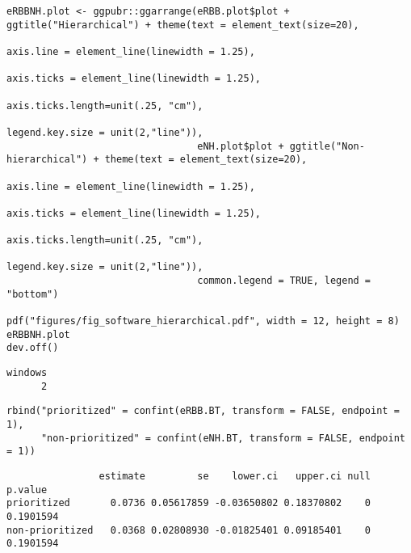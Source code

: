 \documentclass[12pt]{article}
\begin{document}
\lstset{language=r,label= ,caption= ,captionpos=b,numbers=none}
\begin{lstlisting}
eRBBNH.plot <- ggpubr::ggarrange(eRBB.plot$plot + ggtitle("Hierarchical") + theme(text = element_text(size=20), 
                                                                                  axis.line = element_line(linewidth = 1.25),
                                                                                  axis.ticks = element_line(linewidth = 1.25),
                                                                                  axis.ticks.length=unit(.25, "cm"),
                                                                                  legend.key.size = unit(2,"line")),
                                 eNH.plot$plot + ggtitle("Non-hierarchical") + theme(text = element_text(size=20), 
                                                                                     axis.line = element_line(linewidth = 1.25),
                                                                                     axis.ticks = element_line(linewidth = 1.25),
                                                                                     axis.ticks.length=unit(.25, "cm"),
                                                                                     legend.key.size = unit(2,"line")),
                                 common.legend = TRUE, legend = "bottom")

pdf("figures/fig_software_hierarchical.pdf", width = 12, height = 8)
eRBBNH.plot
dev.off()
\end{lstlisting}

\begin{verbatim}
windows 
      2
\end{verbatim}


\lstset{language=r,label= ,caption= ,captionpos=b,numbers=none}
\begin{lstlisting}
rbind("prioritized" = confint(eRBB.BT, transform = FALSE, endpoint = 1),
      "non-prioritized" = confint(eNH.BT, transform = FALSE, endpoint = 1))

\end{lstlisting}

\begin{verbatim}
                estimate         se    lower.ci   upper.ci null   p.value
prioritized       0.0736 0.05617859 -0.03650802 0.18370802    0 0.1901594
non-prioritized   0.0368 0.02808930 -0.01825401 0.09185401    0 0.1901594
\end{verbatim}
\end{document}
